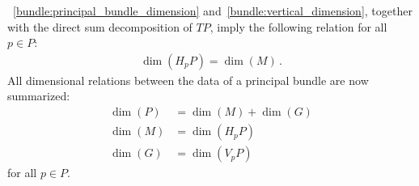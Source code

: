     \begin{property}[Dimension]\label{bundle:connection_dimensions}
        ~\ref{bundle:principal_bundle_dimension} and~\ref{bundle:vertical_dimension}, together with the direct sum decomposition of $TP$, imply the following relation for all $p\in P$:
        \begin{gather}
            \dim(H_pP) = \dim(M)\,.
        \end{gather}
        All dimensional relations between the data of a principal bundle are now summarized:
        \begin{align}
            \dim(P) &= \dim(M) + \dim(G)\nonumber\\
            \dim(M) &= \dim(H_pP)\\
            \dim(G) &= \dim(V_pP)\nonumber
        \end{align}
        for all $p\in P$.
    \end{property}

